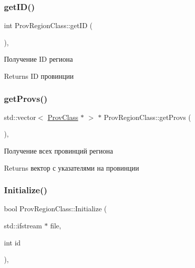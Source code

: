 \subsubsection{\texorpdfstring{get\+I\+D()}{getID()}}
{\footnotesize\ttfamily int Prov\+Region\+Class\+::get\+ID (\begin{DoxyParamCaption}{ }\end{DoxyParamCaption})\hspace{0.3cm}{\ttfamily [virtual]}, {\ttfamily [inherited]}}



Получение ID региона 

\begin{DoxyReturn}{Returns}
ID провинции 
\end{DoxyReturn}
\mbox{\label{class_prov_region_class_a31c1bdb93bda5a0bd0fc66382d39473e}} 
\subsubsection{\texorpdfstring{get\+Provs()}{getProvs()}}
{\footnotesize\ttfamily std\+::vector$<$ \hyperlink{class_prov_class}{Prov\+Class} $\ast$ $>$ $\ast$ Prov\+Region\+Class\+::get\+Provs (\begin{DoxyParamCaption}{ }\end{DoxyParamCaption})\hspace{0.3cm}{\ttfamily [virtual]}, {\ttfamily [inherited]}}



Получение всех провинций региона 

\begin{DoxyReturn}{Returns}
вектор с указателями на провинции 
\end{DoxyReturn}
\mbox{\label{class_prov_region_class_a733b3a8580bd1bb038295a5b8ab4f1a0}} 
\subsubsection{\texorpdfstring{Initialize()}{Initialize()}}
{\footnotesize\ttfamily bool Prov\+Region\+Class\+::\+Initialize (\begin{DoxyParamCaption}\item[{std\+::ifstream $\ast$}]{file,  }\item[{int}]{id }\end{DoxyParamCaption})\hspace{0.3cm}{\ttfamily [virtual]}, {\ttfamily [inherited]}}



